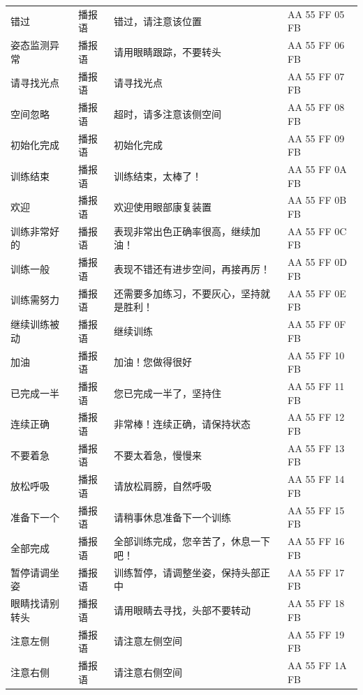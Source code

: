 \begin{longtable}{p{2.5cm} p{2.2cm} p{5.5cm} p{3.5cm}}
错过       & 播报语   & 错过，请注意该位置               & AA 55 FF 05 FB  \\
姿态监测异常   & 播报语   & 请用眼睛跟踪，不要转头           & AA 55 FF 06 FB  \\
请寻找光点 & 播报语   & 请寻找光点                       & AA 55 FF 07 FB  \\
空间忽略   & 播报语   & 超时，请多注意该侧空间           & AA 55 FF 08 FB  \\
初始化完成 & 播报语   & 初始化完成                       & AA 55 FF 09 FB  \\
训练结束   & 播报语   & 训练结束，太棒了！               & AA 55 FF 0A FB  \\
欢迎       & 播报语   & 欢迎使用眼部康复装置             & AA 55 FF 0B FB  \\
训练非常好的   & 播报语   & 表现非常出色正确率很高，继续加油！ & AA 55 FF 0C FB  \\
训练一般   & 播报语   & 表现不错还有进步空间，再接再厉！ & AA 55 FF 0D FB  \\
训练需努力 & 播报语   & 还需要多加练习，不要灰心，坚持就是胜利！ & AA 55 FF 0E FB  \\
继续训练被动   & 播报语   & 继续训练                         & AA 55 FF 0F FB  \\
加油       & 播报语   & 加油！您做得很好                 & AA 55 FF 10 FB  \\
已完成一半 & 播报语   & 您已完成一半了，坚持住           & AA 55 FF 11 FB  \\
连续正确   & 播报语   & 非常棒！连续正确，请保持状态     & AA 55 FF 12 FB  \\
不要着急   & 播报语   & 不要太着急，慢慢来               & AA 55 FF 13 FB  \\
放松呼吸   & 播报语   & 请放松肩膀，自然呼吸             & AA 55 FF 14 FB  \\
准备下一个 & 播报语   & 请稍事休息准备下一个训练         & AA 55 FF 15 FB  \\
全部完成   & 播报语   & 全部训练完成，您辛苦了，休息一下吧！ & AA 55 FF 16 FB  \\
暂停请调坐姿   & 播报语   & 训练暂停，请调整坐姿，保持头部正中 & AA 55 FF 17 FB  \\
眼睛找请别转头 & 播报语   & 请用眼睛去寻找，头部不要转动     & AA 55 FF 18 FB  \\
注意左侧   & 播报语   & 请注意左侧空间                   & AA 55 FF 19 FB  \\
注意右侧   & 播报语   & 请注意右侧空间                   & AA 55 FF 1A FB  \\

\end{longtable}
